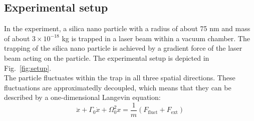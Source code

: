 \documentclass[12pt]{article}
\begin{document}
\subsection{Experimental setup}
In the experiment, a silica nano particle with a radius of about 75 nm and mass of about $3 \times 10^{-18}$ kg is trapped in a laser beam within a
vacuum chamber. The trapping of the silica nano particle is achieved by a gradient force of the
laser beam acting on the particle. The experimental setup is depicted in Fig.~\ref{fig:setup}.\\
The particle fluctuates within the trap in all three spatial directions. These fluctuations are approximatedly
decoupled, which means that they can be described by a one-dimensional Langevin equation:
\begin{equation}
    \label{eq:langevin}
    \ddot{x} + \Gamma_0 \dot{x} + \Omega^2_0x = \frac 1 m \left(F_\text{fluct} + F_\text{ext}\right)
\end{equation}
\end{document}
